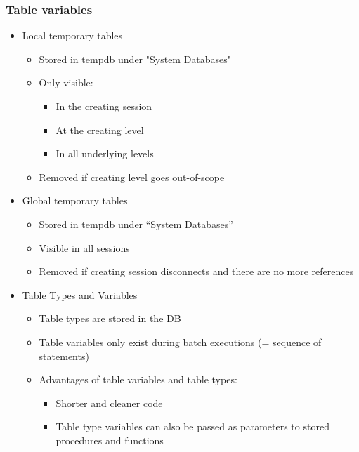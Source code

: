 \documentclass{report}
\begin{document}
    \subsubsection{Table variables}
    \begin{itemize} 
        \item Local temporary tables
        \begin{itemize} 
            \item Stored in tempdb under "System Databases"
            \item Only visible:
            \begin{itemize} 
                \item In the creating session
                \item At the creating level
                \item In all underlying levels
            \end{itemize}
            \item Removed if creating level goes out-of-scope
        \end{itemize}
        \item Global temporary tables
            \begin{itemize} 
                \item Stored in tempdb under ``System Databases''
                \item Visible in all sessions
                \item Removed if creating session disconnects and there are no more references
            \end{itemize}
        \item Table Types and Variables
            \begin{itemize} 
                \item Table types are stored in the DB
                \item Table variables only exist during batch executions (= sequence of statements)
            \end{itemize}
            \begin{itemize} 
                \item Advantages of table variables and table types:
                \begin{itemize} 
                    \item Shorter and cleaner code
                    \item Table type variables can also be passed as parameters to stored procedures and functions

\end{itemize}
\end{itemize}
\end{itemize}
\end{document}
